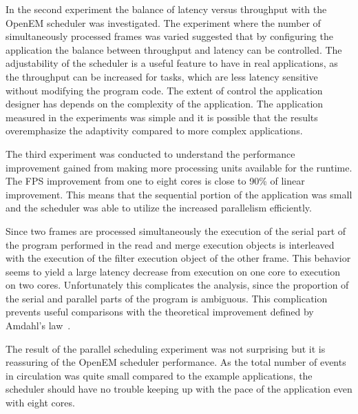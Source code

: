 In the second experiment the balance of latency versus throughput with the OpenEM scheduler was investigated. The experiment where the number of simultaneously processed frames was varied suggested that by configuring the application the balance between throughput and latency can be controlled. The adjustability of the scheduler is a useful feature to have in real applications, as the throughput can be increased for tasks, which are less latency sensitive without modifying the program code. The extent of control the application designer has depends on the complexity of the application. The application measured in the experiments was simple and it is possible that the results overemphasize the adaptivity compared to more complex applications.

The third experiment was conducted to understand the performance improvement gained from making more processing units available for the runtime. The FPS improvement from one to eight cores is close to 90\% of linear improvement. This means that the sequential portion of the application was small and the scheduler was able to utilize the increased parallelism efficiently.

Since two frames are processed simultaneously the execution of the serial part of the program performed in the read and merge execution objects is interleaved with the execution of the filter execution object of the other frame. This behavior seems to yield a large latency decrease from execution on one core to execution on two cores. Unfortunately this complicates the analysis, since the proportion of the serial and parallel parts of the program is ambiguous. This complication prevents useful comparisons with the theoretical improvement defined by Amdahl's law~\cite{amdahl1967validity}.

The result of the parallel scheduling experiment was not surprising but it is reassuring of the OpenEM scheduler performance. As the total number of events in circulation was quite small compared to the example applications, the scheduler should have no trouble keeping up with the pace of the application even with eight cores.

